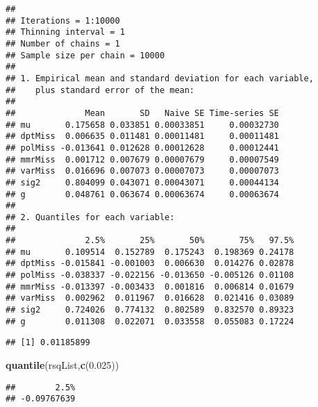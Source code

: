 \documentclass[]{article}
\newenvironment{Shaded}{\begin{snugshade}}{\end{snugshade}}
\newcommand{\DecValTok}[1]{\textcolor[rgb]{0.00,0.00,0.81}{#1}}
\newcommand{\FloatTok}[1]{\textcolor[rgb]{0.00,0.00,0.81}{#1}}
\newcommand{\KeywordTok}[1]{\textcolor[rgb]{0.13,0.29,0.53}{\textbf{#1}}}
\newcommand{\NormalTok}[1]{#1}
\newcommand{\OperatorTok}[1]{\textcolor[rgb]{0.81,0.36,0.00}{\textbf{#1}}}
\newcommand{\StringTok}[1]{\textcolor[rgb]{0.31,0.60,0.02}{#1}}
\begin{document}
\begin{verbatim}
## 
## Iterations = 1:10000
## Thinning interval = 1 
## Number of chains = 1 
## Sample size per chain = 10000 
## 
## 1. Empirical mean and standard deviation for each variable,
##    plus standard error of the mean:
## 
##              Mean       SD   Naive SE Time-series SE
## mu       0.175658 0.033851 0.00033851     0.00032730
## dptMiss  0.006635 0.011481 0.00011481     0.00011481
## polMiss -0.013641 0.012628 0.00012628     0.00012441
## mmrMiss  0.001712 0.007679 0.00007679     0.00007549
## varMiss  0.016696 0.007073 0.00007073     0.00007073
## sig2     0.804099 0.043071 0.00043071     0.00044134
## g        0.048761 0.063674 0.00063674     0.00063674
## 
## 2. Quantiles for each variable:
## 
##              2.5%       25%       50%       75%   97.5%
## mu       0.109514  0.152789  0.175243  0.198369 0.24178
## dptMiss -0.015841 -0.001003  0.006630  0.014276 0.02878
## polMiss -0.038337 -0.022156 -0.013650 -0.005126 0.01108
## mmrMiss -0.013397 -0.003433  0.001816  0.006814 0.01679
## varMiss  0.002962  0.011967  0.016628  0.021416 0.03089
## sig2     0.724026  0.774132  0.802589  0.832570 0.89323
## g        0.011308  0.022071  0.033558  0.055083 0.17224
\end{verbatim}

\begin{Shaded}
\end{Shaded}

\begin{verbatim}
## [1] 0.01185899
\end{verbatim}

\begin{Shaded}
\begin{Highlighting}[]
\KeywordTok{quantile}\NormalTok{(rsqList,}\KeywordTok{c}\NormalTok{(}\FloatTok{0.025}\NormalTok{))}
\end{Highlighting}
\end{Shaded}

\begin{verbatim}
##        2.5% 
## -0.09767639
\end{verbatim}
\end{document}

